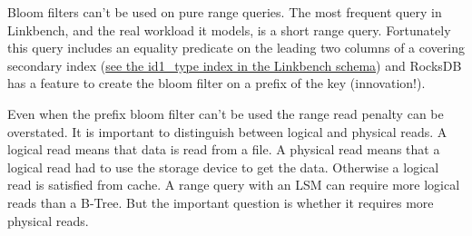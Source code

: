 \documentclass[a4paper,12pt,notitlepage,twoside,openright]{article}
\begin{document}
Bloom filters can't be used on pure range queries. The most frequent
query in Linkbench, and the real workload it models, is a short range
query. Fortunately this query includes an equality predicate on the
leading two columns of a covering secondary index
(\href{https://github.com/mdcallag/linkbench}{see the id1\_type index in
the Linkbench schema}) and RocksDB has a feature to create the bloom
filter on a prefix of the key (innovation!).

Even when the prefix bloom filter can't be used the range read penalty
can be overstated. It is important to distinguish between logical and
physical reads. A logical read means that data is read from a file. A
physical read means that a logical read had to use the storage device to
get the data. Otherwise a logical read is satisfied from cache. A range
query with an LSM can require more logical reads than a B-Tree. But the
important question is whether it requires more physical reads.
\end{document}
